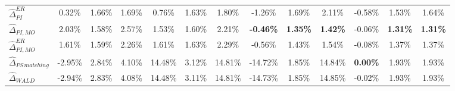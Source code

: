 \documentclass{article}
\begin{document}
\begin{landscape}
\begin{table}[]
{\begin{tabular}{l|lll|lll|lll|lll}
$\widehat{\Delta}_{PI}^{ER}$      &\multicolumn{1}{c}{ 0.32\% }&\multicolumn{1}{c}{ 1.66\% }&\multicolumn{1}{c|}{ 1.69\% }&\multicolumn{1}{c}{ 0.76\% }&\multicolumn{1}{c}{ 1.63\% }&\multicolumn{1}{c|}{ 1.80\% }&\multicolumn{1}{c}{ -1.26\% }&\multicolumn{1}{c}{ 1.69\% }&\multicolumn{1}{c|}{ 2.11\% }&\multicolumn{1}{c}{ -0.58\% }&\multicolumn{1}{c}{ 1.53\% }&\multicolumn{1}{c}{ 1.64\% }\\ 
$\widehat{\Delta}_{PI,MO}$        &\multicolumn{1}{c}{ 2.03\% }&\multicolumn{1}{c}{ 1.58\% }&\multicolumn{1}{c|}{ 2.57\% }&\multicolumn{1}{c}{ 1.53\% }&\multicolumn{1}{c}{ 1.60\% }&\multicolumn{1}{c|}{ 2.21\% }&\multicolumn{1}{c}{ \textbf{-0.46\%} }&\multicolumn{1}{c}{ \textbf{1.35\%} }&\multicolumn{1}{c|}{ \textbf{1.42\%} }&\multicolumn{1}{c}{ -0.06\% }&\multicolumn{1}{c}{ \textbf{1.31\%} }&\multicolumn{1}{c}{ \textbf{1.31\%} }\\ 
$\widehat{\Delta}_{PI,MO}^{ER}$   &\multicolumn{1}{c}{ 1.61\% }&\multicolumn{1}{c}{ 1.59\% }&\multicolumn{1}{c|}{ 2.26\% }&\multicolumn{1}{c}{ 1.61\% }&\multicolumn{1}{c}{ 1.63\% }&\multicolumn{1}{c|}{ 2.29\% }&\multicolumn{1}{c}{ -0.56\% }&\multicolumn{1}{c}{ 1.43\% }&\multicolumn{1}{c|}{ 1.54\% }&\multicolumn{1}{c}{ -0.08\% }&\multicolumn{1}{c}{ 1.37\% }&\multicolumn{1}{c}{ 1.37\% }\\ 
$\widehat{\Delta}_{PS\,matching}$ &\multicolumn{1}{c}{ -2.95\% }&\multicolumn{1}{c}{ 2.84\% }&\multicolumn{1}{c|}{ 4.10\% }&\multicolumn{1}{c}{ 14.48\% }&\multicolumn{1}{c}{ 3.12\% }&\multicolumn{1}{c|}{ 14.81\% }&\multicolumn{1}{c}{ -14.72\% }&\multicolumn{1}{c}{ 1.85\% }&\multicolumn{1}{c|}{ 14.84\% }&\multicolumn{1}{c}{ \textbf{0.00\%} }&\multicolumn{1}{c}{ 1.93\% }&\multicolumn{1}{c}{ 1.93\% }\\ 
$\widehat{\Delta}_{WALD}$         &\multicolumn{1}{c}{ -2.94\% }&\multicolumn{1}{c}{ 2.83\% }&\multicolumn{1}{c|}{ 4.08\% }&\multicolumn{1}{c}{ 14.48\% }&\multicolumn{1}{c}{ 3.11\% }&\multicolumn{1}{c|}{ 14.81\% }&\multicolumn{1}{c}{ -14.73\% }&\multicolumn{1}{c}{ 1.85\% }&\multicolumn{1}{c|}{ 14.85\% }&\multicolumn{1}{c}{ -0.02\% }&\multicolumn{1}{c}{ 1.93\% }&\multicolumn{1}{c}{ 1.93\% }\\ \hline \hline 
\end{tabular} 
} 
\end{table} 
\end{landscape} 
\end{document}
